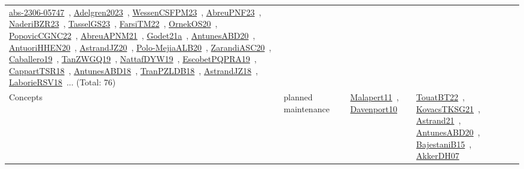 {\begin{longtable}{lp{3cm}>{\raggedright\arraybackslash}p{6cm}>{\raggedright\arraybackslash}p{6cm}>{\raggedright\arraybackslash}p{8cm}}
\href{../works/abs-2306-05747.pdf}{abs-2306-05747}~\cite{abs-2306-05747}, \href{../works/Adelgren2023.pdf}{Adelgren2023}~\cite{Adelgren2023}, \href{../works/WessenCSFPM23.pdf}{WessenCSFPM23}~\cite{WessenCSFPM23}, \href{../works/AbreuPNF23.pdf}{AbreuPNF23}~\cite{AbreuPNF23}, \href{../works/NaderiBZR23.pdf}{NaderiBZR23}~\cite{NaderiBZR23}, \href{../works/TasselGS23.pdf}{TasselGS23}~\cite{TasselGS23}, \href{../works/FarsiTM22.pdf}{FarsiTM22}~\cite{FarsiTM22}, \href{../works/OrnekOS20.pdf}{OrnekOS20}~\cite{OrnekOS20}, \href{../works/PopovicCGNC22.pdf}{PopovicCGNC22}~\cite{PopovicCGNC22}, \href{../works/AbreuAPNM21.pdf}{AbreuAPNM21}~\cite{AbreuAPNM21}, \href{../works/Godet21a.pdf}{Godet21a}~\cite{Godet21a}, \href{../works/AntunesABD20.pdf}{AntunesABD20}~\cite{AntunesABD20}, \href{../works/AntuoriHHEN20.pdf}{AntuoriHHEN20}~\cite{AntuoriHHEN20}, \href{../works/AstrandJZ20.pdf}{AstrandJZ20}~\cite{AstrandJZ20}, \href{../works/Polo-MejiaALB20.pdf}{Polo-MejiaALB20}~\cite{Polo-MejiaALB20}, \href{../works/ZarandiASC20.pdf}{ZarandiASC20}~\cite{ZarandiASC20}, \href{../works/Caballero19.pdf}{Caballero19}~\cite{Caballero19}, \href{../works/TanZWGQ19.pdf}{TanZWGQ19}~\cite{TanZWGQ19}, \href{../works/NattafDYW19.pdf}{NattafDYW19}~\cite{NattafDYW19}, \href{../works/EscobetPQPRA19.pdf}{EscobetPQPRA19}~\cite{EscobetPQPRA19}, \href{../works/CappartTSR18.pdf}{CappartTSR18}~\cite{CappartTSR18}, \href{../works/AntunesABD18.pdf}{AntunesABD18}~\cite{AntunesABD18}, \href{../works/TranPZLDB18.pdf}{TranPZLDB18}~\cite{TranPZLDB18}, \href{../works/AstrandJZ18.pdf}{AstrandJZ18}~\cite{AstrandJZ18}, \href{../works/LaborieRSV18.pdf}{LaborieRSV18}~\cite{LaborieRSV18}... (Total: 76)\\
\index{planned maintenance}\index{Concepts!planned maintenance}Concepts & planned maintenance &  & \href{../works/Malapert11.pdf}{Malapert11}~\cite{Malapert11}, \href{../works/Davenport10.pdf}{Davenport10}~\cite{Davenport10} & \href{../works/TouatBT22.pdf}{TouatBT22}~\cite{TouatBT22}, \href{../works/KovacsTKSG21.pdf}{KovacsTKSG21}~\cite{KovacsTKSG21}, \href{../works/Astrand21.pdf}{Astrand21}~\cite{Astrand21}, \href{../works/AntunesABD20.pdf}{AntunesABD20}~\cite{AntunesABD20}, \href{../works/BajestaniB15.pdf}{BajestaniB15}~\cite{BajestaniB15}, \href{../works/AkkerDH07.pdf}{AkkerDH07}~\cite{AkkerDH07}\\

\end{longtable}}
